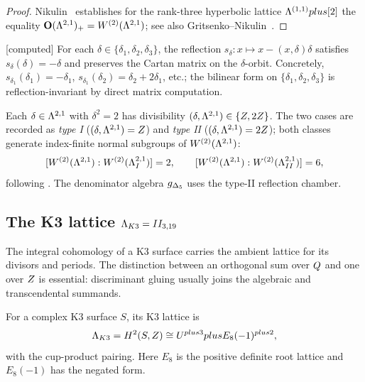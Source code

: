\begin{proof}
Nikulin~\cite[Theorem~1.4.1]{NIKULIN} establishes for the rank-three
hyperbolic lattice $\Lambda^{(1,1)}plus[2]$ the equality
$\mathbf{O}(\Lambda^{2,1})_+=W^{(2)}(\Lambda^{2,1})$; see also
Gritsenko--Nikulin~\cite[Proposition 1.5]{GN}.
\end{proof}

\begin{verification}
\label{ver:type-II-reflection-orbit}
\textnormal{[computed]}
For each $\delta\in\{\delta_1,\delta_2,\delta_3\}$, the reflection
$s_\delta:x\mapsto x-(x,\delta)\delta$ satisfies
$s_\delta(\delta)=-\delta$ and preserves the Cartan matrix on the
$\delta$-orbit.  Concretely, $s_{\delta_1}(\delta_1)=-\delta_1$,
$s_{\delta_1}(\delta_2)=\delta_2+2\delta_1$, etc.; the bilinear form
on $\{\delta_1,\delta_2,\delta_3\}$ is reflection-invariant by direct
matrix computation.
\end{verification}

\begin{remark}
\label{rem:type-I-type-II}
Each $\delta\in\Lambda^{2,1}$ with $\delta^2=2$ has divisibility
$(\delta,\Lambda^{2,1})\in\{Z,2Z\}$.  The two cases are recorded as
\emph{type I} ($(\delta,\Lambda^{2,1})=Z$) and \emph{type II}
($(\delta,\Lambda^{2,1})=2Z$); both classes generate index-finite normal
subgroups of $W^{(2)}(\Lambda^{2,1})$:
\[
[W^{(2)}(\Lambda^{2,1}):W^{(2)}(\Lambda^{2,1}_I)]=2,\qquad
[W^{(2)}(\Lambda^{2,1}):W^{(2)}(\Lambda^{2,1}_{II})]=6,
\]
following \cite[Sections 4--5]{GN}.  The denominator algebra
${g_{\Delta_5}}$ uses the type-II reflection chamber.
\end{remark}

\subsection{The K3 lattice $\Lambda_{K3}=II_{3,19}$}
\label{app:lattice-K3}

The integral cohomology of a K3 surface carries the ambient lattice
for its divisors and periods.  The distinction between an orthogonal
sum over $Q$ and one over $Z$ is essential: discriminant gluing
usually joins the algebraic and transcendental summands.

\begin{definition}[K3 lattice]
\label{def:K3-lattice}
For a complex K3 surface $S$, its K3 lattice is
\[
\Lambda_{K3}=H^2(S,Z)
\cong U^{plus3}plus E_8(-1)^{plus2},
\]
with the cup-product pairing.  Here $E_8$ is the positive definite
root lattice and $E_8(-1)$ has the negated form.
\end{definition}

